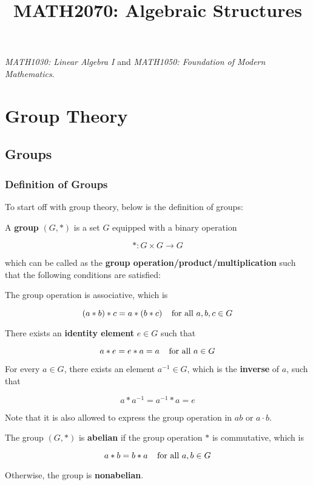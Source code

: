 \documentclass[a4paper,12pt]{article}
\begin{document}
\title{MATH2070: Algebraic Structures}


\remark{}
\begin{prereq}
  \textit{MATH1030: Linear Algebra I} and \textit{MATH1050: Foundation of Modern Mathematics}.
\end{prereq}



\section{Group Theory}
\subsection{Groups}
\subsubsection{Definition of Groups}
To start off with group theory, below is the definition of groups:\n

\begin{dft}
  A \textbf{group} $(G,*)$ is a set $G$ equipped with a binary operation

  $$*:G\times G\rightarrow G$$\s

  which can be called as the \textbf{group operation/product/multiplication} such that the following conditions are satisfied:

  \begin{alist}
    \item The group operation is associative, which is

    $$(a*b)*c=a*(b*c)\;\;\;\;\text{for all }a,b,c\in G$$

    \item There exists an \textbf{identity element} $e\in G$ such that

    $$a*e=e*a=a\;\;\;\;\text{for all }a\in G$$

    \item For every $a\in G$, there exists an element $a^{-1}\in G$, which is the \textbf{inverse} of $a$, such that

    $$a*a^{-1}=a^{-1}*a=e$$
  \end{alist}
\end{dft}\n

Note that it is also allowed to express the group operation in $ab$ or $a\cdot b$.\n

\begin{dft}
  The group $(G,*)$ is \textbf{abelian} if the group operation $*$ is commutative, which is

  $$a*b=b*a\;\;\;\;\text{for all }a,b\in G$$\s

  Otherwise, the group is \textbf{nonabelian}.
\end{dft}\n
\end{document}
